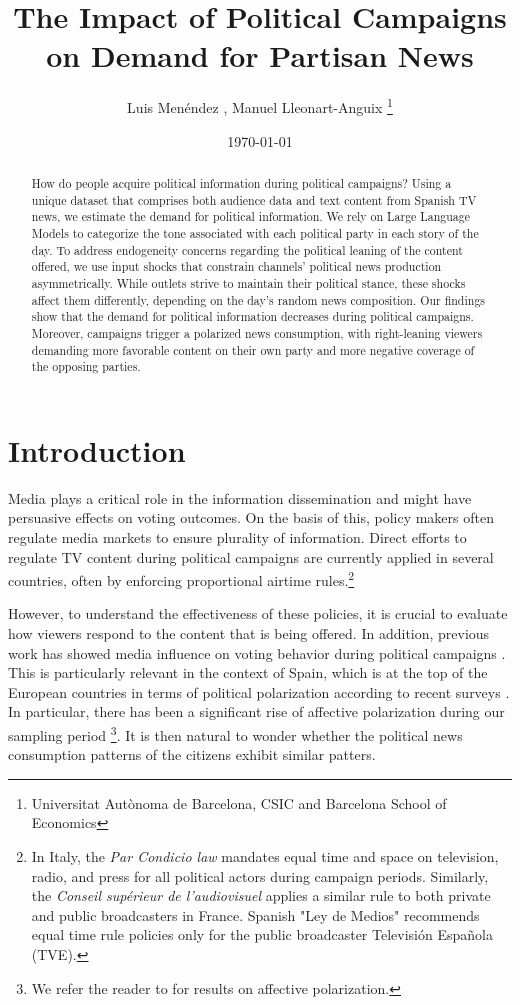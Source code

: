 \documentclass[12pt]{article}
\title{The Impact of Political Campaigns on Demand for Partisan News}
\author{Luis  Menéndez , Manuel Lleonart-Anguix \thanks{Universitat Autònoma de Barcelona, CSIC and Barcelona School of Economics}} %
\date{\today}
\begin{document}
\maketitle

\begin{abstract}
	
How do people acquire political information during political campaigns? Using a unique dataset that comprises both audience data and text content from Spanish TV news, we estimate the demand for political information. We rely on Large Language Models to categorize the tone associated with each political party in each story of the day. To address endogeneity concerns regarding the political leaning of the content offered, we use input shocks that constrain channels' political news production asymmetrically. While outlets strive to maintain their political stance, these shocks affect them differently, depending on the day's random news composition. Our findings show that the demand for political information decreases during political campaigns. Moreover, campaigns trigger a polarized news consumption, with right-leaning viewers demanding more favorable content on their own party and more negative coverage of the opposing parties.
 
\end{abstract}



\section{Introduction }


Media plays a critical role in the information dissemination and might have persuasive effects on voting outcomes. On the basis of this, policy makers often regulate media markets  to ensure plurality of information.  Direct efforts to regulate TV content during political campaigns are currently applied in several countries, often by enforcing proportional airtime rules.\footnote{In Italy, the \textit{Par Condicio law} mandates equal time and space on television, radio, and press for all political actors during campaign periods. Similarly, the \textit{Conseil supérieur de l'audiovisuel} applies a similar rule to both private and public broadcasters in France. Spanish "Ley de Medios" recommends equal time rule policies only for the public broadcaster Televisión Española (TVE).}

However, to understand the effectiveness of these policies, it is crucial to evaluate how viewers respond to the content that is being offered. In addition, previous work has showed media influence on voting behavior during political campaigns \citep{enikolopov}. This is particularly relevant in the context of Spain, which is at the top of the European countries in terms of political polarization according to recent surveys \citep{edelman_trust_2023}. In particular, there has been a significant  rise of affective polarization during our sampling period \footnote{  We refer the reader to  \cite {cemop_polarization_2024} for results on affective polarization.}. It is then natural to wonder whether the political news consumption patterns of the citizens exhibit similar patters. 
\end{document}
